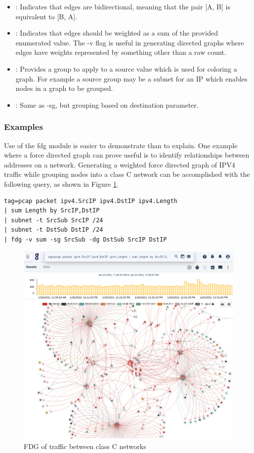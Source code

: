\begin{itemize}
\item
  : Indicates that edges are bidirectional, meaning that the pair
  [A, B] is equivalent to [B, A].
\item
  : Indicates that edges
  should be weighted as a sum of the provided enumerated value. The -v
  flag is useful in generating directed graphs where edges have weights
  represented by something other than a raw count.
\item
  : Provides a group to
  apply to a source value which is used for coloring a graph. For
  example a source group may be a subnet for an IP which enables nodes
  in a graph to be grouped.
\item
  : Same as -sg, but
  grouping based on destination parameter.
\end{itemize}

\subsubsection{Examples}

Use of the fdg module is easier to demonstrate than to explain. One
example where a force directed graph can prove useful is to identify
relationships between addresses on a network. Generating a weighted
force directed graph of IPV4 traffic while grouping nodes into a class C
network can be accomplished with the following query, as shown in Figure \ref{fig:fdg-classC}.

\begin{Verbatim}[breaklines=true]
tag=pcap packet ipv4.SrcIP ipv4.DstIP ipv4.Length 
| sum Length by SrcIP,DstIP 
| subnet -t SrcSub SrcIP /24 
| subnet -t DstSub DstIP /24 
| fdg -v sum -sg SrcSub -dg DstSub SrcIP DstIP
\end{Verbatim}

\begin{figure}
	\includegraphics[width=0.6\linewidth]{images/fdg-classC.png}
	\caption{FDG of traffic between class C networks}
	\label{fig:fdg-classC}
\end{figure}

